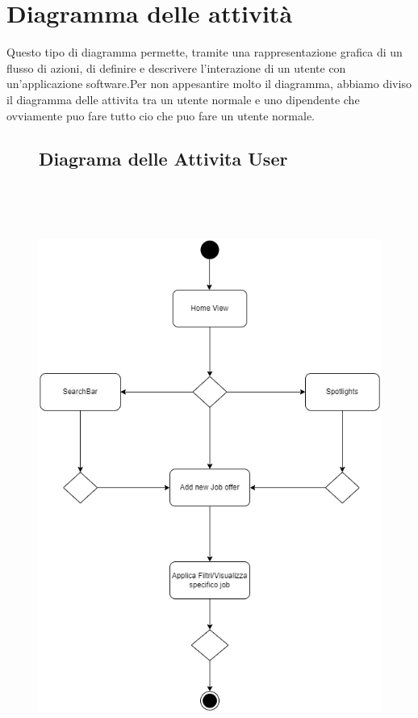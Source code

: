 \documentclass[ 4paper,11pt,openany]{book}
\begin{document}
\section{Diagramma delle attività}
Questo tipo di diagramma permette, tramite una rappresentazione grafica di un flusso di azioni,
di definire e descrivere l'interazione di un utente con un’applicazione software.Per non appesantire
molto il diagramma, abbiamo diviso il diagramma delle attivita tra un utente normale e uno dipendente che ovviamente puo fare tutto cio che puo fare un utente normale.
\begin{figure}[htpb!] 
	\subsection{Diagrama delle Attivita User}
	\includegraphics[height=190mm,width=165mm]{Activity_Diagram_User.png}
\end{figure}
\end{document}
